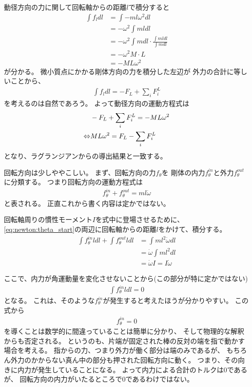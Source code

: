 \documentclass[a4paper,11pt]{jsarticle}
\begin{document}
動径方向の力に関して回転軸からの距離$l$で積分すると
\begin{align*}
  \int f_l dl 
  &= \int -ml\omega^2 dl
  \\
  &= -\omega^2 \int ml dl
  \\
  &= -\omega^2 \int m dl \cdot \frac{ \int ml dl }{\int m dl }
  \\
  &= -\omega^2 M \cdot L
  \\
  &= -ML\omega^2
\end{align*}
が分かる。
微小質点にかかる剛体方向の力を積分した左辺が
外力の合計に等しいことから、
\begin{align*}
  \int f_l dl = -F_L + \sum_i F_i^{L}
\end{align*}
を考えるのは自然であろう。
よって動径方向の運動方程式は
\begin{align}
  & -F_L + \sum_i F_i^{L} = -ML\omega^2
  \notag
  \\
  \Leftrightarrow
  & ML\omega^2 = F_L - \sum_i F_i^{L}
  \label{eq:newton:length_end}
\end{align}
となり、ラグランジアンからの導出結果と一致する。

回転方向は少しややこしい。
まず、回転方向の力$f_\theta$を
剛体の内力$f_\theta^{in}$と外力$f_\theta^{out}$に分類する。
つまり回転方向の運動方程式は
\begin{align}
  f_\theta^{in} + f_\theta^{out} = ml\dot\omega
  \label{eq:newton:theta_start}
\end{align}
と表される。
正直これから書く内容は定かではない。

回転軸周りの慣性モーメント$I$を式中に登場させるために、
\ref{eq:newton:theta_start}の両辺に回転軸からの距離$l$をかけて、積分する。
\begin{align*}
  \int f_\theta^{in} l dl + \int f_\theta^{out} l dl
  &= \int ml^2\dot\omega dl
  \\
  &= \dot\omega\int ml^2 dl
  \\
  &= \dot\omega I = I\dot\omega
\end{align*}

ここで、内力が角運動量を変化させないことから(この部分が特に定かではない)
\begin{align*}
  \int f_\theta^{in} l dl = 0
\end{align*}
となる。
これは、そのような$f_\theta^{in}$が発生すると考えたほうが分かりやすい。
この式から
\begin{align*}
  f_\theta^{in} = 0
\end{align*}
を導くことは数学的に間違っていることは簡単に分かり、
そして物理的な解釈からも否定される。
というのも、片端が固定された棒の反対の端を指で動かす場合を考える。
指からの力、つまり外力が働く部分は端のみであるが、
もちろん外力のかからない真ん中の部分も押された回転方向に動く。
つまり、その向きに内力が発生していることになる。
よって内力による合計のトルクは0であるが、
回転方向の内力がいたるところで0であるわけではない。
\end{document}

